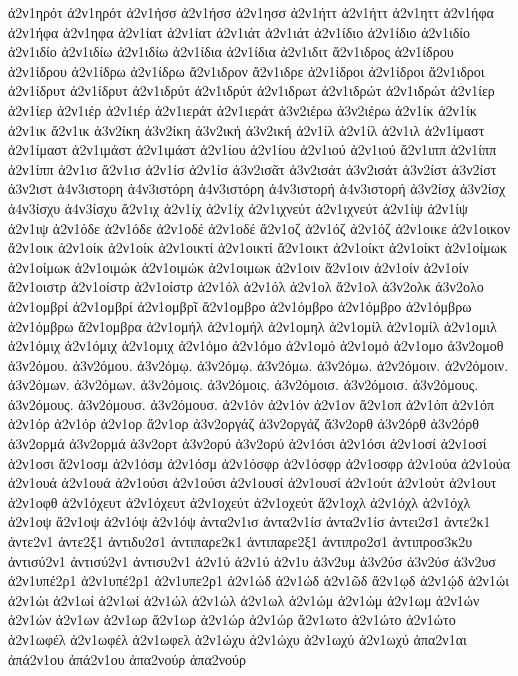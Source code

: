 {ἀ2ν1ηρότ  ἀ2ν1ηρότ
ἀ2ν1ήσσ  ἀ2ν1ήσσ
ἀ2ν1ησσ
ἀ2ν1ήττ  ἀ2ν1ήττ
ἀ2ν1ηττ
ἀ2ν1ήφα  ἀ2ν1ήφα
ἀ2ν1ηφα
ἀ2ν1ίατ  ἀ2ν1ίατ
ἀ2ν1ιάτ  ἀ2ν1ιάτ
ἀ2ν1ίδιο  ἀ2ν1ίδιο
ἀ2ν1ιδίο  ἀ2ν1ιδίο
ἀ2ν1ιδίω  ἀ2ν1ιδίω
ἀ2ν1ίδια  ἀ2ν1ίδια
ἀ2ν1ιδιτ
ἄ2ν1ιδρος
ἀ2ν1ίδρου  ἀ2ν1ίδρου
ἀ2ν1ίδρω  ἀ2ν1ίδρω
ἄ2ν1ιδρον
ἄ2ν1ιδρε
ἀ2ν1ίδροι  ἀ2ν1ίδροι
ἄ2ν1ιδροι
ἀ2ν1ίδρυτ  ἀ2ν1ίδρυτ
ἀ2ν1ιδρύτ  ἀ2ν1ιδρύτ
ἀ2ν1ιδρωτ
ἀ2ν1ιδρώτ  ἀ2ν1ιδρώτ
ἀ2ν1ίερ  ἀ2ν1ίερ
ἀ2ν1ιέρ  ἀ2ν1ιέρ
ἀ2ν1ιεράτ  ἀ2ν1ιεράτ
ἀ3ν2ιέρω  ἀ3ν2ιέρω
ἀ2ν1ίκ  ἀ2ν1ίκ
ἀ2ν1ικ
ἄ2ν1ικ
ἀ3ν2ίκη  ἀ3ν2ίκη
ἀ3ν2ική  ἀ3ν2ική
ἀ2ν1ίλ  ἀ2ν1ίλ
ἀ2ν1ιλ
ἀ2ν1ίμαστ  ἀ2ν1ίμαστ
ἀ2ν1ιμάστ  ἀ2ν1ιμάστ
ἀ2ν1ίου  ἀ2ν1ίου
ἀ2ν1ιού  ἀ2ν1ιού
ἄ2ν1ιππ
ἀ2ν1ίππ  ἀ2ν1ίππ
ἀ2ν1ισ
ἄ2ν1ισ
ἀ2ν1ίσ  ἀ2ν1ίσ
ἀ3ν2ισᾶτ
ἀ3ν2ισάτ  ἀ3ν2ισάτ
ἀ3ν2ίστ  ἀ3ν2ίστ
ἀ3ν2ιστ
ἀ4ν3ιστορη
ἀ4ν3ιστόρη  ἀ4ν3ιστόρη
ἀ4ν3ιστορή  ἀ4ν3ιστορή
ἀ3ν2ίσχ  ἀ3ν2ίσχ
ἀ4ν3ίσχυ  ἀ4ν3ίσχυ
ἄ2ν1ιχ
ἀ2ν1ίχ  ἀ2ν1ίχ
ἀ2ν1ιχνεύτ  ἀ2ν1ιχνεύτ
ἀ2ν1ίψ  ἀ2ν1ίψ
ἀ2ν1ιψ
ἀ2ν1όδε  ἀ2ν1όδε
ἀ2ν1οδέ  ἀ2ν1οδέ
ἄ2ν1οζ
ἀ2ν1όζ  ἀ2ν1όζ
ἀ2ν1οικε
ἀ2ν1οικον
ἄ2ν1οικ
ἀ2ν1οίκ  ἀ2ν1οίκ
ἀ2ν1οικτί  ἀ2ν1οικτί
ἄ2ν1οικτ
ἀ2ν1οίκτ  ἀ2ν1οίκτ
ἀ2ν1οίμωκ  ἀ2ν1οίμωκ
ἀ2ν1οιμώκ  ἀ2ν1οιμώκ
ἀ2ν1οιμωκ
ἀ2ν1οιν
ἄ2ν1οιν
ἀ2ν1οίν  ἀ2ν1οίν
ἄ2ν1οιστρ
ἀ2ν1οίστρ  ἀ2ν1οίστρ
ἀ2ν1όλ  ἀ2ν1όλ
ἀ2ν1ολ
ἄ2ν1ολ
ἀ3ν2ολκ
ἀ3ν2ολο
ἀ2ν1ομβρί  ἀ2ν1ομβρί
ἀ2ν1ομβρῖ
ἄ2ν1ομβρο
ἀ2ν1όμβρο  ἀ2ν1όμβρο
ἀ2ν1όμβρω  ἀ2ν1όμβρω
ἄ2ν1ομβρα
ἀ2ν1ομήλ  ἀ2ν1ομήλ
ἀ2ν1ομηλ
ἀ2ν1ομίλ  ἀ2ν1ομίλ
ἀ2ν1ομιλ
ἀ2ν1όμιχ  ἀ2ν1όμιχ
ἀ2ν1ομιχ
ἀ2ν1όμο  ἀ2ν1όμο
ἀ2ν1ομό  ἀ2ν1ομό
ἀ2ν1ομο
ἀ3ν2ομοθ
ἀ3ν2όμου.  ἀ3ν2όμου.
ἀ3ν2όμῳ.  ἀ3ν2όμῳ.
ἀ3ν2όμω.  ἀ3ν2όμω.
ἀ2ν2όμοιν.  ἀ2ν2όμοιν.
ἀ3ν2όμων.  ἀ3ν2όμων.
ἀ3ν2όμοις.  ἀ3ν2όμοις.
ἀ3ν2όμοισ.  ἀ3ν2όμοισ.
ἀ3ν2όμους.  ἀ3ν2όμους.
ἀ3ν2όμουσ.  ἀ3ν2όμουσ.
ἀ2ν1όν  ἀ2ν1όν
ἀ2ν1ον
ἄ2ν1οπ
ἀ2ν1όπ  ἀ2ν1όπ
ἀ2ν1όρ  ἀ2ν1όρ
ἀ2ν1ορ
ἄ2ν1ορ
ἀ3ν2οργάζ  ἀ3ν2οργάζ
ἄ3ν2ορθ
ἀ3ν2όρθ  ἀ3ν2όρθ
ἀ3ν2ορμά  ἀ3ν2ορμά
ἀ3ν2ορτ
ἀ3ν2ορύ  ἀ3ν2ορύ
ἀ2ν1όσι  ἀ2ν1όσι
ἀ2ν1οσί  ἀ2ν1οσί
ἀ2ν1οσι
ἄ2ν1οσμ
ἀ2ν1όσμ  ἀ2ν1όσμ
ἀ2ν1όσφρ  ἀ2ν1όσφρ
ἀ2ν1οσφρ
ἀ2ν1ούα  ἀ2ν1ούα
ἀ2ν1ουά  ἀ2ν1ουά
ἀ2ν1ούσι  ἀ2ν1ούσι
ἀ2ν1ουσί  ἀ2ν1ουσί
ἀ2ν1ούτ  ἀ2ν1ούτ
ἀ2ν1ουτ
ἀ2ν1οφθ
ἀ2ν1όχευτ  ἀ2ν1όχευτ
ἀ2ν1οχεύτ  ἀ2ν1οχεύτ
ἄ2ν1οχλ
ἀ2ν1όχλ  ἀ2ν1όχλ
ἀ2ν1οψ
ἄ2ν1οψ
ἀ2ν1όψ  ἀ2ν1όψ
ἀντα2ν1ισ
ἀντα2ν1ίσ  ἀντα2ν1ίσ
ἀντει2σ1
ἀντε2κ1
ἀντε2ν1
ἀντε2ξ1
ἀντιδυ2σ1
ἀντιπαρε2κ1
ἀντιπαρε2ξ1
ἀντιπρο2σ1
ἀντιπροσ3κ2υ
ἀντισύ2ν1  ἀντισύ2ν1
ἀντισυ2ν1
ἀ2ν1ύ  ἀ2ν1ύ
ἀ2ν1υ
ἀ3ν2υμ
ἀ3ν2ύσ  ἀ3ν2ύσ
ἀ3ν2υσ
ἀ2ν1υπέ2ρ1  ἀ2ν1υπέ2ρ1
ἀ2ν1υπε2ρ1
ἀ2ν1ώδ  ἀ2ν1ώδ
ἀ2ν1ῶδ
ἄ2ν1ῳδ
ἀ2ν1ῴδ
ἀ2ν1ώι  ἀ2ν1ώι
ἀ2ν1ωί  ἀ2ν1ωί
ἀ2ν1ώλ  ἀ2ν1ώλ
ἀ2ν1ωλ
ἀ2ν1ώμ  ἀ2ν1ώμ
ἀ2ν1ωμ
ἀ2ν1ών  ἀ2ν1ών
ἀ2ν1ων
ἀ2ν1ωρ
ἄ2ν1ωρ
ἀ2ν1ώρ  ἀ2ν1ώρ
ἄ2ν1ωτο
ἀ2ν1ώτο  ἀ2ν1ώτο
ἀ2ν1ωφέλ  ἀ2ν1ωφέλ
ἀ2ν1ωφελ
ἀ2ν1ώχυ  ἀ2ν1ώχυ
ἀ2ν1ωχύ  ἀ2ν1ωχύ
ἀπα2ν1αι
ἀπά2ν1ου  ἀπά2ν1ου
ἀπα2νούρ  ἀπα2νούρ
}
